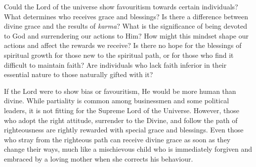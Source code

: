 \newpage
\begin{mananam}{}
\normalfont\mananamtext Could the Lord of the universe show favouritism towards certain individuals? What determines who receives grace and blessings? Is there a difference between divine grace and the results of \emph{karma}? What is the significance of being devoted to God and surrendering our actions to Him? How might this mindset shape our actions and affect the rewards we receive?
Is there no hope for the blessings of spiritual growth for those new to the spiritual path, or for those who find it difficult to maintain faith? Are individuals who lack faith inferior in their essential nature to those naturally gifted with it?
\end{mananam}
\sreflect
\begin{inspiration}{}
\normalfont\mananamtext If the Lord were to show bias or favouritism, He would be more human than divine. While partiality is common among businessmen and some political leaders, it is not fitting for the Supreme Lord of the Universe. However, those who adopt the right attitude, surrender to the Divine, and follow the path of righteousness are rightly rewarded with special grace and blessings.
Even those who stray from the righteous path can receive divine grace as soon as they change their ways, much like a mischievous child who is immediately forgiven and embraced by a loving mother when she corrects his behaviour.
\end{inspiration}
\newpage

